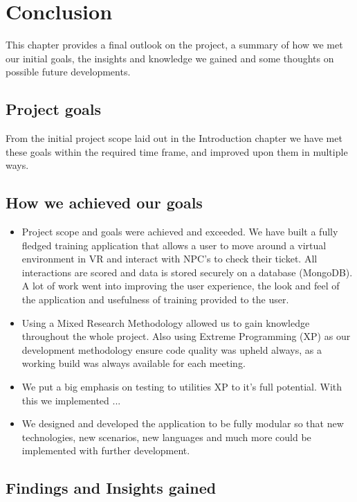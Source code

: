 \chapter{Conclusion}
This chapter provides a final outlook on the project, a summary of how we met our initial goals, the insights and knowledge we gained and some thoughts on possible future developments.

\section{Project goals}
From the initial project scope laid out in the Introduction chapter we have met these goals within the required time frame, and improved upon them in multiple ways.

\section{How we achieved our goals}
\begin{itemize}
    \item Project scope and goals were achieved and exceeded. We have built a fully fledged training application that allows a user to move around a virtual environment in VR and interact with NPC's to check their ticket. All interactions are scored and data is stored securely on a database (MongoDB). A lot of work went into improving the user experience, the look and feel of the application and usefulness of training provided to the user. 

    \item Using a Mixed Research Methodology allowed us to gain knowledge throughout the whole project. Also using Extreme Programming (XP) as our development methodology ensure code quality was upheld always, as a working build was always available for each meeting.
    
    \item We put a big emphasis on testing to utilities XP to it's full potential. With this we implemented ...
    
    \item We designed and developed the application to be fully modular so that new technologies, new scenarios, new languages and much more could be implemented with further development.

\end{itemize}


\section{Findings and Insights gained}

